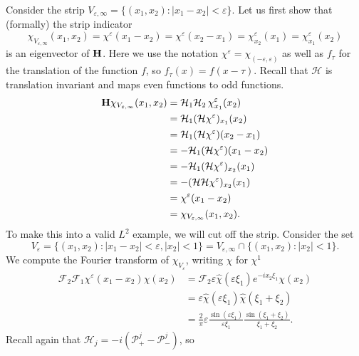 \documentclass{article}
\def\H{{\bf H}}
\begin{document}
	Consider the strip $V_{\varepsilon, \infty} = \{ (x_1, x_2) : | x_1 - x_2 | <
	\varepsilon \}$. Let us first show that (formally) the strip indicator
	\[ \chi_{V_{\varepsilon, \infty}} (x_1, x_2) = \chi^{\varepsilon} (x_1 - x_2)
	= \chi^{\varepsilon} (x_2 - x_1) = \chi^{\varepsilon}_{x_2} (x_1) =
	\chi_{x_1}^{\varepsilon} (x_2) \]
	is an eigenvector of $\H$. Here we use the notation
	$\chi^{\varepsilon} = \chi_{(- \varepsilon, \varepsilon)}$ as well as
	$f_{\tau}$ for the translation of the function $f$, so $f_{\tau} (x) = f (x -
	\tau)$. Recall that $\mathcal{H}$ is translation invariant and maps even
	functions to odd functions.
	\begin{align*}
		\H \chi_{V_{\varepsilon, \infty}} (x_1, x_2)
		& = \mathcal{H}_1\mathcal{H}_2\, \chi_{x_1}^{\varepsilon} (x_2) \\[.1em]
		& =\mathcal{H}_1 (\mathcal{H} \chi^{\varepsilon})_{x_1} (x_2) \\[.1em]
		& =\mathcal{H}_1 (\mathcal{H}\chi^{\varepsilon}) (x_2 - x_1) \\[.1em]
		&= -\mathcal{H}_1 (\mathcal{H}\chi^{\varepsilon}) (x_1 - x_2)\\[.1em]
		& =  -\mathcal{H}_1 (\mathcal{H} \chi^{\varepsilon})_{x_2} (x_1) \\[.1em]
		&= -(\mathcal{H}\mathcal{H} \chi^{\varepsilon})_{x_2} (x_1) \\[.1em]
		& = \chi^{\varepsilon}(x_1 - x_2)\\[.1em]
		& = \chi_{V_{\varepsilon,\infty}} (x_1, x_2) .
	\end{align*}
	To make this into a valid $L^2$ example, we will cut off the strip. Consider
	the set
	\[ V_{\varepsilon} = \{ (x_1, x_2) : | x_1 - x_2 | < \varepsilon, | x_2 | < 1
	\} = V_{\varepsilon, \infty} \cap \{ (x_1, x_2) : | x_2 | < 1 \} . \]
	We compute the Fourier transform of $\chi_{V_{\varepsilon}}$, writing $\chi$
	for $\chi^1$
	\begin{align*}
		\mathcal{F}_2 \mathcal{F}_1 \chi^{\varepsilon} (x_1 - x_2) \chi (x_2)
		& =
		\mathcal{F}_2 \varepsilon \hat{\chi} (\varepsilon \xi_1) e^{- i x_2 \xi_1}
		\chi (x_2) \\[.7em]
		&= \varepsilon \hat{\chi} (\varepsilon \xi_1) \hat{\chi} (\xi_1 +
		\xi_2) \\[.9em]
		&= \frac{2}{\pi} \varepsilon \frac{\sin (\varepsilon
			\xi_1)}{\varepsilon \xi_1} \frac{\sin (\xi_1 + \xi_2)}{\xi_1 + \xi_2} .
	\end{align*}
	Recall again that $\mathcal{H}_j= - i (\mathcal P^j_+ - \mathcal P^j_-)$, so
\end{document}
